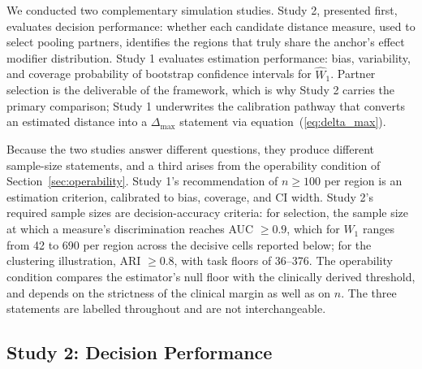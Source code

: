 \documentclass[AMA,Times1COL]{WileyNJDv5}
\begin{document}
We conducted two complementary simulation studies. Study 2, presented first, evaluates decision performance: whether each candidate distance measure, used to select pooling partners, identifies the regions that truly share the anchor's effect modifier distribution. Study 1 evaluates estimation performance: bias, variability, and coverage probability of bootstrap confidence intervals for $\widehat{W}_1$. Partner selection is the deliverable of the framework, which is why Study 2 carries the primary comparison; Study 1 underwrites the calibration pathway that converts an estimated distance into a $\Delta_{\max}$ statement via equation~(\ref{eq:delta_max}).

Because the two studies answer different questions, they produce different sample-size statements, and a third arises from the operability condition of Section~\ref{sec:operability}. Study 1's recommendation of $n \geq 100$ per region is an estimation criterion, calibrated to bias, coverage, and CI width. Study 2's required sample sizes are decision-accuracy criteria: for selection, the sample size at which a measure's discrimination reaches AUC $\geq 0.9$, which for $\widehat{W}_1$ ranges from 42 to 690 per region across the decisive cells reported below; for the clustering illustration, ARI $\geq 0.8$, with task floors of 36--376. The operability condition compares the estimator's null floor with the clinically derived threshold, and depends on the strictness of the clinical margin as well as on $n$. The three statements are labelled throughout and are not interchangeable.

\subsection{Study 2: Decision Performance}\label{sec:study2}

\end{document}
